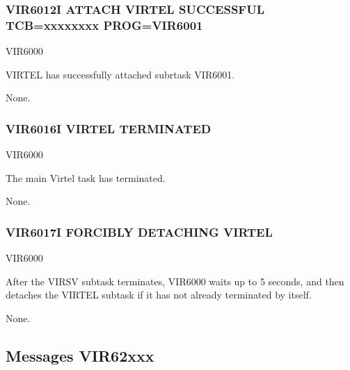 \documentclass[letterpaper,10pt,english]{sphinxmanual}
\begin{document}
\subsubsection{VIR6012I ATTACH VIRTEL SUCCESSFUL TCB=xxxxxxxx PROG=VIR6001}
\label{\detokenize{messages:vir6012i-attach-virtel-successful-tcb-xxxxxxxx-prog-vir6001}}\begin{description}
\sphinxAtStartPar
VIR6000

\sphinxAtStartPar
VIRTEL has successfully attached subrtask VIR6001.

\sphinxAtStartPar
None.

\end{description}


\subsubsection{VIR6016I VIRTEL TERMINATED}
\label{\detokenize{messages:vir6016i-virtel-terminated}}\begin{description}
\sphinxAtStartPar
VIR6000

\sphinxAtStartPar
The main Virtel task has terminated.

\sphinxAtStartPar
None.

\end{description}


\subsubsection{VIR6017I FORCIBLY DETACHING VIRTEL}
\label{\detokenize{messages:vir6017i-forcibly-detaching-virtel}}\begin{description}
\sphinxAtStartPar
VIR6000

\sphinxAtStartPar
After the VIRSV subtask terminates, VIR6000 waits up to 5 seconds, and then detaches the VIRTEL subtask if it has not already terminated by itself.

\sphinxAtStartPar
None.

\end{description}


\subsection{Messages VIR62xxx}
\label{\detokenize{messages:messages-vir62xxx}}
\end{document}
